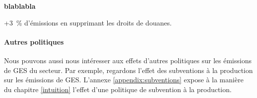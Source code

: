 \textbf{blablabla}

+3~\% d'émissions en supprimant les droits de douanes.

\paragraph{Autres politiques}\label{Sec_subvention}
Nous pouvons aussi nous intéresser aux effets d'autres politiques sur les émissions de GES du secteur. Par exemple, regardons l'effet des subventions à la production sur les émissions de GES. L'annexe \ref{appendix:subventions} expose à la manière du chapitre \ref{intuition} l'effet d'une politique de subvention à la production.